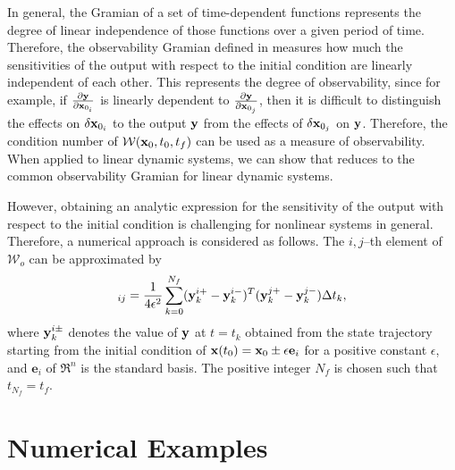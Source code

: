 In general, the Gramian of a set of time-dependent functions represents the degree of linear independence of those functions over a given period of time. Therefore, the observability Gramian defined in  measures how much the sensitivities of the output with respect to the initial condition are linearly independent of each other. This represents the degree of observability, since for example, if $\frac{\partial \mathbf{y}}{\partial \mathbf{x}_{0_i}}$ is linearly dependent to $\frac{\partial \mathbf{y}}{\partial \mathbf{x}_{0_j}}$, then it is difficult to distinguish the effects on $\delta \mathbf{x}_{0_i}$ to the output $\mathbf{y}$ from the effects of $\delta \mathbf{x}_{0_j}$ on $\mathbf{y}$. Therefore, the condition number of $\mathcal{W} (\mathbf{x}_0,t_0,t_f)$ can be used as a measure of observability. When applied to linear dynamic systems, we can show that  reduces to the common observability Gramian for linear dynamic systems.

However, obtaining an analytic expression for the sensitivity of the output with respect to the initial condition is challenging for nonlinear systems in general. Therefore, a numerical approach is considered as follows. The $i,j$--th element of $\mathcal{W}_o$ can be approximated by
\begin{align}
[\mathcal{W}]_{ij} = \frac{1}{4\epsilon^2}\sum_{k=0}^{N_f} (\y^{i+}_k-\y^{i-}_k)^T(\y^{j+}_k-\y^{j-}_k) \Delta t_k,
\end{align}
where $\mathbf{y}^{i\pm}_k$ denotes the value of $\mathbf{y}$ at $t=t_k$ obtained from the state trajectory starting from the initial condition of $\mathbf{x}(t_0)=\mathbf{x}_0\pm \epsilon \mathbf{e}_i $ for a positive constant $\epsilon$, and $\mathbf{e}_i$ of $\Re^n$ is the standard basis. The positive integer $N_f$ is chosen such that $t_{N_f}=t_f$. 






\section{Numerical Examples}



